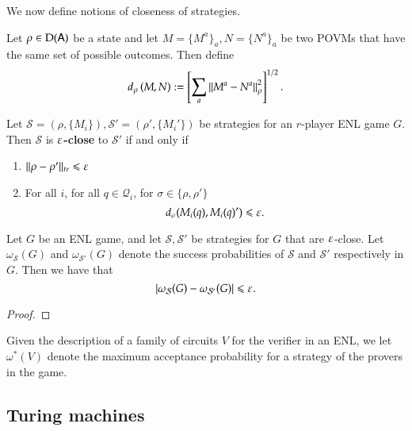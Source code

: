 We now define notions of closeness of strategies. 

\begin{definition}
	Let $\rho \in \mathrm{D}({\mathsf{A}})$ be a state and let $M = \{M^a\}_a,N = \{N^a\}_a$ be two POVMs that have the same set of possible outcomes. Then define 
	\begin{align}
		d_\rho \left( M, N \right) := \left[ \sum_a \left\lVert M^a - N^a \right\rVert_\rho^2 \right]^{1/2}.
	\end{align}
\end{definition}


\begin{definition}
	Let $\mathcal{S} = (\rho,\{M_i\}), \mathcal{S}' = (\rho',\{M_i'\})$ be strategies for an $r$-player ENL game $G$. Then $\mathcal{S}$ is \textbf{$\varepsilon$-close} to $\mathcal{S}'$ if and only if
	\begin{enumerate}
		\item $ \lVert \rho - \rho'\rVert_{tr} \leqslant \varepsilon$
		\item For all $i$, for all $q \in \mathcal{Q}_i$, for $\sigma \in \{\rho,\rho'\}$
		\[
		d_\sigma(M_i(q),M_i(q)') \leqslant \varepsilon.
		\]
	\end{enumerate}
\end{definition}

\begin{lemma}
\label{lem:close_strategies}
	Let $G$ be an ENL game, and let $\mathcal{S},\mathcal{S}'$ be strategies for $G$ that are $\varepsilon$-close. Let $\omega_{\mathcal{S}}(G)$ and $\omega_{\mathcal{S}'}(G)$ denote the success probabilities of $\mathcal{S}$ and $\mathcal{S}'$ respectively in $G$. Then we have that
	\[
		\left\lvert \omega_{\mathcal{S}}(G) - \omega_{\mathcal{S}'}(G) \right\rvert \leqslant \varepsilon.
	\]
\end{lemma}
\begin{proof}
\end{proof}

\begin{definition}
Given the description of a family of circuits $V$ for the verifier in an ENL, we let $\omega^*(V)$ denote the maximum acceptance probability for a strategy of the provers in the game. 
\end{definition}


\subsection{Turing machines}
\label{sec:turing_machines}


